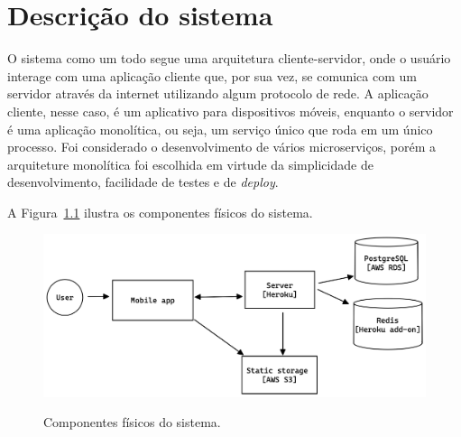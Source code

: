 \chapter{Descrição do sistema}


O sistema como um todo segue uma arquitetura cliente-servidor, onde o usuário interage com uma aplicação cliente que, por sua vez, se comunica com um servidor através da internet utilizando algum protocolo de rede. A aplicação cliente, nesse caso, é um aplicativo para dispositivos móveis, enquanto o servidor é uma aplicação monolítica, ou seja, um serviço único que roda em um único processo. Foi considerado o desenvolvimento de vários microserviços, porém a arquiteture monolítica foi escolhida em virtude da simplicidade de desenvolvimento, facilidade de testes e de \emph{deploy}.

A Figura~\ref{f.system} ilustra os componentes físicos do sistema.

\begin{figure}[htbp]
	\caption{\small Componentes físicos do sistema.}
	\centering
	\includegraphics[width=\textwidth]{../diagrams/out/system.png}
	\label{f.system}
\end{figure}


